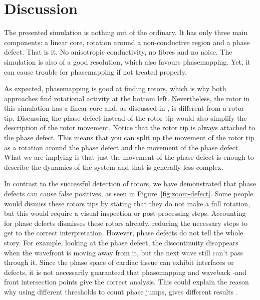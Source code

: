 \documentclass[twocolumn]{article}
\begin{document}
\section{Discussion}\label{discussion}

The presented simulation is nothing out of the ordinary. It has only
three main components: a linear core, rotation around a non-conductive
region and a phase defect. That is it. No anisotropic conductivity, no
fibres and no noise. The simulation is also of a good resolution, which
also favours phasemapping. Yet, it can cause trouble for phasemapping if
not treated properly.

As expected, phasemapping is good at finding rotors, which is why both
approaches find rotational activity at the bottom left. Nevertheless,
the rotor in this simulation has a linear core and, as discussed in
\autocite{arno2021a, tomii2021spatial}, is different from a rotor tip.
Discussing the phase defect instead of the rotor tip would also simplify
the description of the rotor movement. Notice that the rotor tip is
always attached to the phase defect. This means that you can split up
the movement of the rotor tip as a rotation around the phase defect and
the movement of the phase defect. What we are implying is that just the
movement of the phase defect is enough to describe the dynamics of the
system and that is generally less complex.

In contrast to the successful detection of rotors, we have demonstrated
that phase defects can cause false positives, as seen in
Figure~\ref{fig:zoom-defect}. Some people would dismiss these rotors tips
by stating that they do not make a full rotation, but this would require
a visual inspection or post-processing steps. Accounting for phase
defects dismisses these rotors already, reducing the necessary steps to
get to the correct interpretation.
However, phase defects do not tell the whole story. For example, looking
at the phase defect, the discontinuity disappears when the wavefront is
moving away from it, but the next wave still can't pass through it.
Since the phase space of cardiac tissue can exhibit interfaces or
defects, it is not necessarily guaranteed that phasemapping and waveback
-and front intersection points give the correct analysis. This could
explain the reason why using different thresholds to count phase jumps,
gives different results \autocite{li2020standardizing}.
\end{document}
